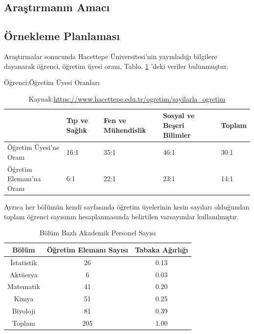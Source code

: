 \documentclass{article}
\begin{document}
\subsection{Araştırmanın Amacı}

\subsection{Örnekleme Planlaması}
Araştırmalar sonucunda Hacettepe Üniversitesi'nin yayınladığı bilgilere dayanarak öğrenci, öğretim üyesi oranı, Tablo. \ref{tab:Öğrenci:Öğretim Üyesi Oranları} 'deki veriler bulunmuştur.

\begin{table}[h]
    \centering
    \caption{Öğrenci:Öğretim Üyesi Oranları}
    \label{tab:Öğrenci:Öğretim Üyesi Oranları}

    \begin{tabular}{|p{2.1cm}|p{2.1cm}|p{2.1cm}|p{2.1cm}|p{2.1cm}|}
        \hline
         & Tıp ve Sağlık & Fen ve Mühendislik & Sosyal ve Beşeri Bilimler & Toplam \\
        \hline
        Öğretim Üyesi'ne Oranı & 16:1 & 35:1 & 46:1 & 30:1 \\
        \hline
        Öğretim Elemanı'na Oranı & 6:1 & 22:1 & 23:1 & 14:1 \\
        \hline
    \end{tabular}
    \caption*{\footnotesize Kaynak:\url{https://www.hacettepe.edu.tr/ogretim/sayilarla_ogretim}}
\end{table}

Ayrıca her bölümün kendi sayfasında öğretim üyelerinin kesin sayıları olduğundan toplam öğrenci sayısının hesaplanmasında belirtilen varsayımlar kullanılmıştır.

\begin{table}[h]
    \centering
    \caption{Bölüm Bazlı Akademik Personel Sayısı}
    \label{tab:Bölüm Bazlı Veriler}
    
    \begin{tabular}{|c|c|c|}
         \hline
         Bölüm & Öğretim Elemanı Sayısı & Tabaka Ağırlığı\\
         \hline
         İstatistik & 26 & 0.13 \\
         Aktüerya & 6 & 0.03 \\
         Matematik & 41 & 0.20 \\
         Kimya & 51 & 0.25 \\
         Biyoloji & 81 & 0.39 \\
         \hline
         Toplam & 205 & 1.00 \\
         \hline
    \end{tabular}
\end{table}
\end{document}
